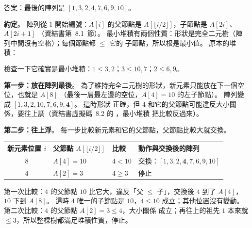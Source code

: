 \begin{pastsoln}
答案：最後的陣列是 $[1, 3, 2, 4, 7, 6, 9, 10]$。

\textbf{約定}。 陣列從 $1$ 開始編號：$A[i]$ 的父節點是 $A[\lfloor i/2 \rfloor]$，子節點是 $A[2i]$、$A[2i+1]$
（資結書第~8.1~節）。 最小堆積有兩個性質：形狀是完全二元樹（陣列中間沒有空格）；每個節點都 $\le$ 它的
子節點，所以根是最小值。 原本的堆積：
\begin{center}
\end{center}
檢查一下它確實是最小堆積：$1 \le 3, 2$；$3 \le 10, 7$；$2 \le 6, 9$。

\textbf{第一步：放在陣列最後}。 為了維持完全二元樹的形狀，新元素只能放在下一個空位，也就是 $A[8]$
（最後一層最左邊的空位，$A[4] = 10$ 的左子節點）。 陣列變成 $[1, 3, 2, 10, 7, 6, 9, \mathbf{4}]$。 這時形狀
正確，但 $4$ 和它的父節點可能違反大小關係，要往上調（資結書虛擬碼~8.2 的 ，最小堆積
把比較反過來）。

\textbf{第二步：往上浮}。 每一步比較新元素和它的父節點，父節點比較大就交換。
\begin{center}
\begin{tabular}{clll}
\toprule
新元素位置 $i$ & 父節點 $A[\lfloor i/2 \rfloor]$ & 比較 & 動作與交換後的陣列 \\
\midrule
$8$ & $A[4] = 10$ & $4 < 10$ & 交換：$[1, 3, 2, \mathbf{4}, 7, 6, 9, 10]$ \\
$4$ & $A[2] = 3$ & $4 \ge 3$ & 停止 \\
\bottomrule
\end{tabular}
\end{center}
第一次比較：$4$ 的父節點 $10$ 比它大，違反「父 $\le$ 子」，交換後 $4$ 到了 $A[4]$，$10$ 下到 $A[8]$。 這時
$4$ 唯一的子節點是 $10$，$4 \le 10$ 成立；其他位置沒有變動。 第二次比較：$4$ 的父節點 $A[2] = 3 \le 4$，大小關係
成立；再往上的祖先 $1$ 本來就 $\le 3$，所以整棵樹都滿足堆積性質，停止。


\end{pastsoln}
